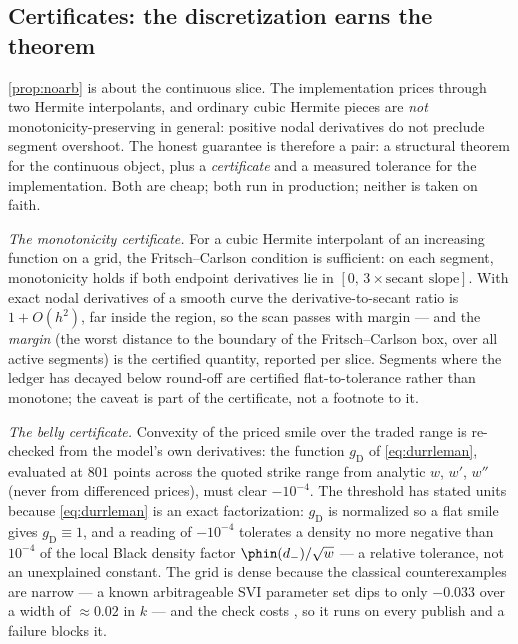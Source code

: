 \subsection{Certificates: the discretization earns the theorem}
\label{sec:certificates}

\cref{prop:noarb} is about the continuous slice.  The implementation
prices through two Hermite interpolants, and ordinary cubic Hermite
pieces are \emph{not} monotonicity-preserving in general: positive nodal
derivatives do not preclude segment overshoot.  The honest guarantee is
therefore a pair: a structural theorem for the continuous object, plus a
\emph{certificate} and a measured tolerance for the implementation.
Both are cheap; both run in production; neither is taken on faith.

\emph{The monotonicity certificate.}  For a cubic Hermite interpolant of
an increasing function on a grid, the Fritsch--Carlson condition
\citep{FritschCarlson1980} is sufficient: on each segment, monotonicity
holds if both endpoint derivatives lie in $[0,\,3\times\text{secant
slope}]$.  With exact nodal derivatives of a smooth curve the
derivative-to-secant ratio is $1+O(h^{2})$, far inside the region, so
the scan passes with margin --- and the \emph{margin} (the worst
distance to the boundary of the Fritsch--Carlson box, over all active
segments) is the certified quantity, reported per slice.  Segments where
the ledger has decayed below round-off are certified
flat-to-tolerance rather than monotone; the caveat is part of the
certificate, not a footnote to it.

\emph{The belly certificate.}  Convexity of the priced smile over the
traded range is re-checked from the model's own derivatives: the
function $g_{\mathrm{D}}$ of \eqref{eq:durrleman}, evaluated at $801$
points across the quoted strike range from analytic $w$, $w'$, $w''$
(never from differenced prices), must clear $-10^{-4}$.  The threshold
has stated units because \eqref{eq:durrleman} is an exact
factorization: $g_{\mathrm{D}}$ is normalized so a flat smile gives
$g_{\mathrm{D}}\equiv1$, and a reading of $-10^{-4}$ tolerates a
density no more negative than $10^{-4}$ of the local Black density
factor $\phin(d_-)/\sqrt{w}$ --- a relative tolerance, not an
unexplained constant.  The grid is
dense because the classical counterexamples are narrow --- a known
arbitrageable SVI parameter set dips to only $-0.033$ over a width of
$\approx0.02$ in $k$ --- and the check costs \MacBellyCertMs, so it runs
on every publish and a failure blocks it.

